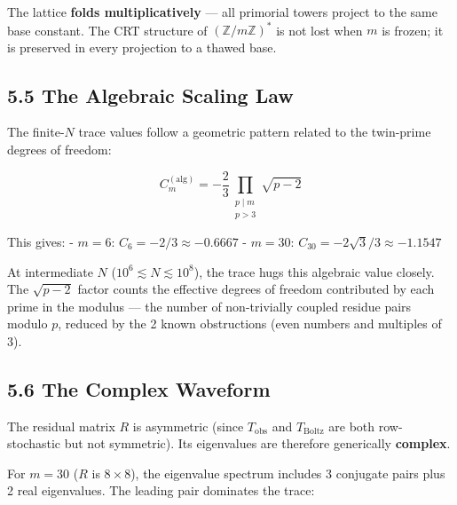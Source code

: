 \documentclass[
  11pt,
]{article}
\numberwithin{equation}{section}
\begin{document}
The lattice \textbf{folds multiplicatively} --- all primorial towers
project to the same base constant. The CRT structure of
\((\mathbb{Z}/m\mathbb{Z})^*\) is not lost when \(m\) is frozen; it is
preserved in every projection to a thawed base.

\subsection{5.5 The Algebraic Scaling
Law}\label{the-algebraic-scaling-law}

The finite-\(N\) trace values follow a geometric pattern related to the
twin-prime degrees of freedom:

\begin{equation}C_m^{(\text{alg})} = -\frac{2}{3} \prod_{\substack{p \mid m \\ p > 3}} \sqrt{p - 2}\end{equation}

This gives: - \(m = 6\): \(C_6 = -2/3 \approx -0.6667\) - \(m = 30\):
\(C_{30} = -2\sqrt{3}/3 \approx -1.1547\)

At intermediate \(N\) (\(10^6 \lesssim N \lesssim 10^8\)), the trace
hugs this algebraic value closely. The \(\sqrt{p-2}\) factor counts the
effective degrees of freedom contributed by each prime in the modulus
--- the number of non-trivially coupled residue pairs modulo \(p\),
reduced by the 2 known obstructions (even numbers and multiples of 3).

\subsection{5.6 The Complex Waveform}\label{the-complex-waveform}

The residual matrix \(R\) is asymmetric (since \(T_{\text{obs}}\) and
\(T_{\text{Boltz}}\) are both row-stochastic but not symmetric). Its
eigenvalues are therefore generically \textbf{complex}.

For \(m = 30\) (\(R\) is \(8 \times 8\)), the eigenvalue spectrum
includes 3 conjugate pairs plus 2 real eigenvalues. The leading pair
dominates the trace:
\end{document}
